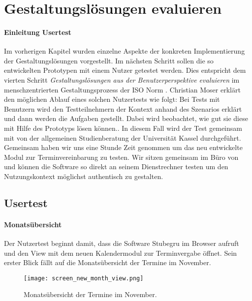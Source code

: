 \chapter{Gestaltungslösungen evaluieren}
\label{chapter:evaluation}

\subsubsection{Einleitung Usertest}
Im vorherigen Kapitel wurden einzelne Aspekte der konkreten Implementierung der
Gestaltungslösungen vorgestellt. Im nächsten Schritt sollen die so entwickelten
Prototypen mit einem Nutzer getestet werden. Dies entspricht dem vierten
Schritt \textit{Gestaltungslösungen aus der Benutzerperspektive evaluieren} im
menschzentrierten Gestaltungsprozess der ISO Norm \cite{iso9241}. Christian
Moser erklärt den möglichen Ablauf eines solchen Nutzertests wie folgt:
\glqq{}Bei Tests mit Benutzern wird den Testteilnehmern der Kontext anhand des
Szenarios erklärt und dann werden die Aufgaben gestellt. Dabei wird beobachtet,
wie gut sie diese mit Hilfe des Prototyps lösen können.\grqq{}\cite{moserTesting}. In diesem Fall wird der Test gemeinsam mit \ipName von der allgemeinen Studienberatung der Universität Kassel durchgeführt. Gemeinsam haben wir uns eine Stunde Zeit genommen um das neu entwickelte Modul zur Terminvereinbarung zu testen. Wir sitzen gemeinsam im Büro von \ipName und können die Software so direkt an seinem Dienstrechner testen um den Nutzungskontext möglichst authentisch zu gestalten.

\section{Usertest}
\subsubsection{Monatsübersicht}
Der Nutzertest beginnt damit, dass \ipName die Software Stubegru im Browser
aufruft und den View mit dem neuen Kalendermodul zur Terminvergabe öffnet. Sein
erster Blick fällt auf die Monatsübersicht der Termine im November.

\begin{figure}[H]
    \caption{Monatsübersicht der Termine im November.}
    \centering
    \texttt{[image: screen\_new\_month\_view.png]}
\end{figure}

